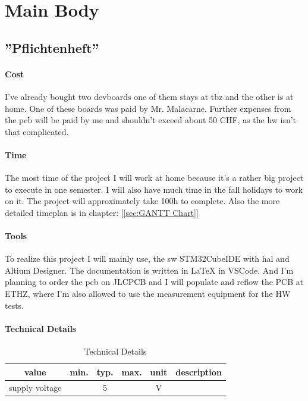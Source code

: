 \chapter{Main Body}
\label{cha:Main Body}


\section{''Pflichtenheft''}
\label{sec:Pflichtenheft}

\subsubsection{Cost}
I've already bought two \acs{devboard}s one of them stays at \acs{tbz} and the other is at home. One of these boards was paid by Mr. Malacarne. Further expenses from the \acs{pcb} will be paid by me and shouldn't exceed about 50 CHF, as the \acs{hw} isn't that complicated.

\subsubsection{Time}
The most time of the project I will work at home because it's a rather big project to execute in one semester. I will also have much time in the fall holidays to work on it. The project will approximately take 100h to complete. Also the more detailed timeplan is in chapter: [\ref{sec:GANTT Chart}]

\subsubsection{Tools}
To realize this project I will mainly use, the \acs{sw} STM32CubeIDE with \acs{hal} and Altium Designer. The documentation is written in LaTeX in VSCode. And I'm planning to order the \acs{pcb} on JLCPCB and I will populate and reflow the PCB at ETHZ, where I'm also allowed to use the measurement equipment for the HW tests.


\subsubsection{Technical Details}
\begin{table}[H]
    \centering
    \label{tab:Technical Details}
\begin{tabular}{||c || c | c | c | c  || c ||} 
 \hline
 value &  min. & typ. & max. & unit & description \\ [0.5ex] 
 \hline\hline
  supply voltage & & 5 & & V & \\ 
 \hline
\end{tabular}
    \caption{Technical Details}
\end{table}

